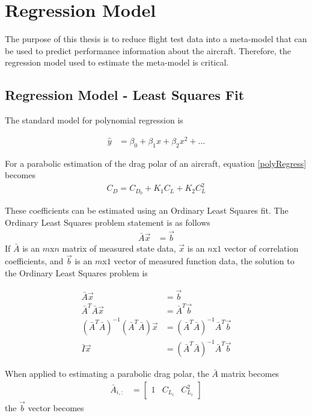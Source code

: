 \documentclass[12pt]{ucthesis}
\begin{document}
\chapter{Regression Model}
The purpose of this thesis is to reduce flight test data into a meta-model that can be used to predict performance information about the aircraft. Therefore, the regression model used to estimate the meta-model is critical. 

\section{Regression Model - Least Squares Fit}
The standard model for polynomial regression is

\begin{align}
\label{polyRegress}
\hat{y} &= \beta_0 + \beta_1x + \beta_2x^2+...
\end{align}

For a parabolic estimation of the drag polar of an aircraft, equation \ref{polyRegress} becomes
\begin{align}
C_D = C_{D_0} + K_1 C_L+K_2 C^2_L
\end{align}

These coefficients can be estimated using an Ordinary Least Squares fit. The Ordinary Least Squares problem statement is as follows
\begin{align}
\bar{A}\vec{x} &= \vec{b}
\end{align}
If $\bar{A}$ is an $m$x$n$ matrix of measured state data, $\vec{x}$ is an $n$x$1$ vector of correlation coefficients, and $\vec{b}$ is an $m$x$1$ vector of measured function data, the solution to the Ordinary Least Squares problem is 

\begin{align}
\bar{A}\vec{x}&=\vec{b}\\
\bar{A}^T\bar{A}\vec{x} &= \bar{A}^T\vec{b}\\
(\bar{A}^T\bar{A})^{-1}(\bar{A}^T \bar{A})\vec{x} &= (\bar{A}^T\bar{A})^{-1}\bar{A}^T\vec{b}\\
\bar{I}\vec{x} &=(\bar{A}^T\bar{A})^{-1}\bar{A}^T\vec{b}
\end{align}

When applied to estimating a parabolic drag polar, the $\bar{A}$ matrix becomes
\begin{align}
\bar{A}_{i,:} &= 
\begin{bmatrix}
1 & C_{L_i} & C^2_{L_i}
\end{bmatrix}
\end{align}
the $\vec{b}$ vector becomes
\end{document}
